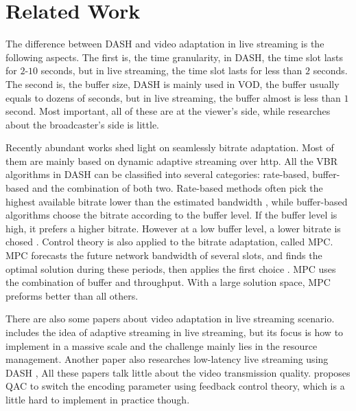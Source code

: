 \section{Related Work}
The difference between DASH and video adaptation in live streaming is the following aspects. The first is, the time granularity, in DASH, the time slot lasts for $2$-$10$ seconds, but in live streaming, the time slot lasts for less than $2$ seconds. The second is, the buffer size, DASH is mainly used in VOD, the buffer usually equals to dozens of seconds, but in live streaming, the buffer almost is less than $1$ second. Most important, all of these are at the viewer's side, while researches about the broadcaster's side is little.

Recently abundant works shed light on seamlessly bitrate adaptation. Most of them are mainly based on dynamic adaptive streaming over http. All the VBR algorithms in DASH can be classified into several categories: rate-based, buffer-based and the combination of both two. Rate-based methods often pick the highest available bitrate lower than the estimated bandwidth \cite{jiang2014improving}, while buffer-based algorithms choose the bitrate according to the buffer level. If the buffer level is high, it prefers a higher bitrate. However at a low buffer level, a lower bitrate is chosed \cite{huang2003adaptive}. Control theory is also applied to the bitrate adaptation, called MPC. MPC forecasts the future network bandwidth of several slots, and finds the optimal solution during these periods, then applies the first choice \cite{yin2015control}. MPC uses the combination of buffer and throughput. With a large solution space, MPC preforms better than all others.

There are also some papers about video adaptation in live streaming scenario. \cite{pires2014dash} includes the idea of adaptive streaming in live streaming, but its focus is how to implement in a massive scale and the challenge mainly lies in the resource management. Another paper also researches low-latency live streaming using DASH \cite{bouzakaria2014overhead}, All these papers talk little about the video transmission quality. \cite{de2011feedback} proposes QAC to switch the encoding parameter using feedback control theory, which is a little hard to implement in practice though.
